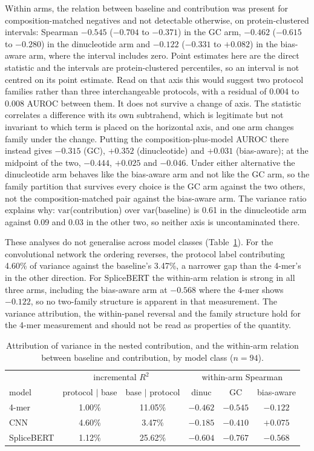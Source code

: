 Within arms, the relation between baseline and contribution was present for composition-matched
negatives and not detectable otherwise, on protein-clustered intervals: Spearman $-0.545$
($-0.704$ to $-0.371$) in the GC arm, $-0.462$ ($-0.615$ to $-0.280$) in the dinucleotide arm
and $-0.122$ ($-0.331$ to $+0.082$) in the bias-aware arm, where the interval includes zero.
Point estimates here are the direct statistic and the intervals are protein-clustered
percentiles, so an interval is not centred on its point estimate. Read on that axis this would
suggest two protocol families rather than three interchangeable protocols, with a residual of
0.004 to 0.008 AUROC between them. It does not survive a change of axis. The statistic
correlates a difference with its own subtrahend, which is legitimate but not invariant to which
term is placed on the horizontal axis, and one arm changes family under the change. Putting
the composition-plus-model AUROC there instead gives $-0.315$ (GC), $+0.352$ (dinucleotide) and
$+0.031$ (bias-aware); at the midpoint of the two, $-0.444$, $+0.025$ and $-0.046$. Under either
alternative the dinucleotide arm behaves like the bias-aware arm and not like the GC arm, so
the family partition that survives every choice is the GC arm against the two others, not the
composition-matched pair against the bias-aware arm. The variance ratio explains why:
$\mathrm{var}$(contribution) over
$\mathrm{var}$(baseline) is 0.61 in the dinucleotide arm against 0.09 and 0.03 in the other two, so
neither axis is uncontaminated there.

These analyses do not generalise across model classes (Table~\ref{tab:generalise}). For the
convolutional network the ordering reverses, the protocol label contributing 4.60\% of variance
against the baseline's 3.47\%, a narrower gap than the 4-mer's in the other direction. For
SpliceBERT the within-arm relation is strong in all three arms, including the bias-aware arm at
$-0.568$ where the 4-mer shows $-0.122$, so no two-family
structure is apparent in that measurement. The variance attribution, the within-panel reversal
and the family structure hold for the 4-mer measurement and should not be read as properties
of the quantity.

\begin{table}[htbp]
\centering
\caption{Attribution of variance in the nested contribution, and the within-arm relation between
baseline and contribution, by model class ($n=94$).}
\label{tab:generalise}
\begin{tabular}{lccccc}
\toprule
 & \multicolumn{2}{c}{incremental $R^2$} & \multicolumn{3}{c}{within-arm Spearman} \\
model & protocol $\mid$ base & base $\mid$ protocol & dinuc & GC & bias-aware \\
\midrule
4-mer & 1.00\% & 11.05\% & $-0.462$ & $-0.545$ & $-0.122$ \\
CNN & 4.60\% & 3.47\% & $-0.185$ & $-0.410$ & $+0.075$ \\
SpliceBERT & 1.12\% & 25.62\% & $-0.604$ & $-0.767$ & $-0.568$ \\
\bottomrule
\end{tabular}
\end{table}


